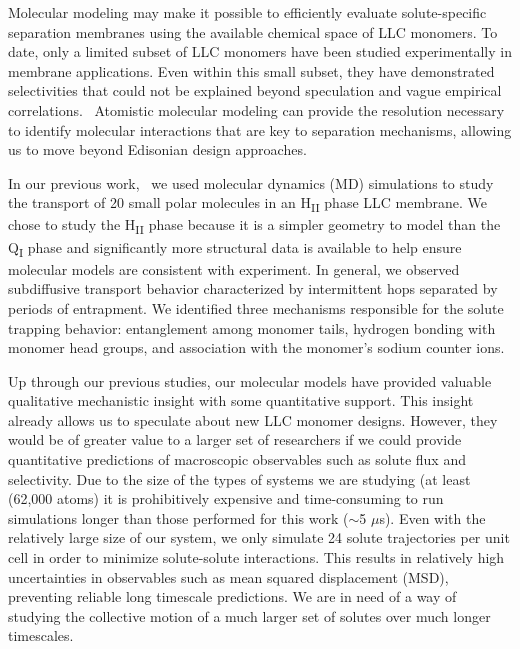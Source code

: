 \documentclass[aps,pre,preprint,groupedaddress,longbibliography]{revtex4-2}
\begin{document}
  Molecular modeling may make it possible to efficiently evaluate
  solute-specific separation membranes using the available chemical space of
  LLC monomers. To date, only a limited subset of LLC monomers have been
  studied experimentally in membrane applications.
  \cite{carter_glycerol-based_2012,hatakeyama_nanoporous_2010,smith_ordered_1997,zhou_assembly_2003,resel_structural_2000}
  Even within this small subset, they have demonstrated selectivities that
  could not be explained beyond speculation and vague empirical
  correlations.~\cite{dischinger_application_2017} Atomistic molecular modeling
  can provide the resolution necessary to identify molecular interactions that
  are key to separation mechanisms, allowing us to move beyond Edisonian design
  approaches.

  In our previous work,~\cite{coscia_chemically_2019} we used molecular
  dynamics (MD) simulations to study the transport of 20 small polar molecules
  in an H\textsubscript{II} phase LLC membrane. We chose to study the
  H\textsubscript{II} phase because it is a simpler geometry to model than the
  Q\textsubscript{I} phase and significantly more structural data is available
  to help ensure molecular models are consistent with experiment. In general,
  we observed subdiffusive transport behavior characterized by intermittent
  hops separated by periods of entrapment. We identified three mechanisms
  responsible for the solute trapping behavior: entanglement among monomer
  tails, hydrogen bonding with monomer head groups, and association with the
  monomer's sodium counter ions.
  
  Up through our previous studies, our molecular models have provided valuable
  qualitative mechanistic insight with some quantitative support. This insight
  already allows us to speculate about new LLC monomer designs. However, they
  would be of greater value to a larger set of researchers if we could provide
  quantitative predictions of macroscopic observables such as solute flux and
  selectivity. Due to the size of the types of systems we are studying (at
  least (62,000 atoms) it is prohibitively expensive and time-consuming to run
  simulations longer than those performed for this work ($\sim$5 $\mu$s).  Even
  with the relatively large size of our system, we only simulate 24 solute
  trajectories per unit cell in order to minimize solute-solute interactions.
  This results in relatively high uncertainties in observables such as mean
  squared displacement (MSD), preventing reliable long timescale predictions.
  We are in need of a way of studying the collective motion of a much larger
  set of solutes over much longer timescales.
  
\end{document}
